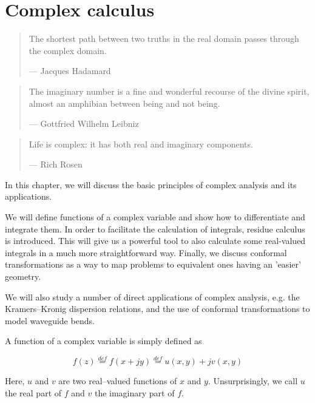 \chapter{Complex calculus}
\label{h:complex}

\begin{quote}
The shortest path between two truths in the real domain passes through the complex domain.

--- Jacques Hadamard
\end{quote}

\begin{quote}
The imaginary number is a fine and wonderful recourse of the divine spirit, almost an amphibian between being and not being.

--- Gottfried Wilhelm Leibniz
\end{quote}

\begin{quote}
  Life is complex: it has both real and imaginary components.
  
--- Rich Rosen
\end{quote}

\chaptertoc

In this chapter, we will discuss the basic principles of complex analysis and its applications.

We will define functions of a complex variable and show how to differentiate and integrate them. In order to facilitate the calculation of integrals, residue calculus is introduced. This will give us a powerful tool to also calculate some real-valued integrals in a much more straightforward way. Finally, we discuss conformal transformations as a way to map problems to equivalent ones having an 'easier' geometry. 

We will also study a number of direct applications of complex analysis, e.g. the Kramers--Kronig dispersion relations, and the use of conformal transformations to model waveguide bends.



\pagebreak



A function of a complex variable is simply defined as

\begin{equation}
f(z) \stackrel{def}{=} f(x + j y) \stackrel{def}{=}  u(x,y) + j v(x,y)
\end{equation}

Here, $u$ and $v$ are two real--valued functions of $x$ and $y$. Unsurprisingly, we call $u$ the real part of $f$ and $v$ the imaginary part of $f$.


